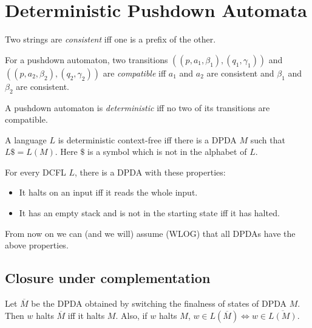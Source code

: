 
\section{Deterministic Pushdown Automata}

\begin{definition}
Two strings are \emph{consistent} iff one is a prefix of the other.
\end{definition}
\begin{definition}
For a pushdown automaton, two transitions $((p, a_1, \beta_1), (q_1, \gamma_1))$
and $((p, a_2, \beta_2), (q_2, \gamma_2))$ are \emph{compatible} iff
$a_1$ and $a_2$ are consistent and $\beta_1$ and $\beta_2$ are consistent.
\end{definition}
\begin{definition}
A pushdown automaton is \emph{deterministic} iff no two of its transitions are compatible.
\end{definition}
\begin{definition}
A language $L$ is deterministic context-free iff there is a DPDA $M$
such that $L\$ = L(M)$. Here $\$$ is a symbol which is not in the alphabet of $L$.
\end{definition}

\begin{theorem}
\label{halt-properties}
For every DCFL $L$,
there is a DPDA with these properties:
\begin{itemize}
\item It halts on an input iff it reads the whole input.
\item It has an empty stack and is not in the starting state iff it has halted.
\end{itemize}
\end{theorem}
From now on we can (and we will) assume (WLOG) that all DPDAs have the above properties.

\subsection{Closure under complementation}

\begin{theorem}
\label{dpda-complement}
Let $\overline{M}$ be the DPDA obtained by switching the finalness of states of DPDA $M$.
Then $w$ halts $\overline{M}$ iff it halts $M$.
Also, if $w$ halts $M$, $w \in L(\overline{M}) \iff w \in \overline{L(M)}$.
\end{theorem}

